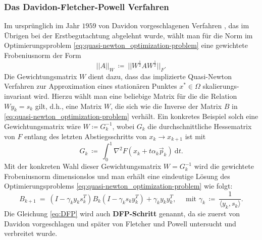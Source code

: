 \subsubsection{Das Davidon-Fletcher-Powell Verfahren}
Im ursprünglich im Jahr $1959$ von Davidon vorgeschlagenen Verfahren \cite{davidon_1959}, das im Übrigen bei der Erstbegutachtung abgelehnt wurde, wählt man für die Norm im Optimierungsproblem \eqref{eq:quasi-newton_optimization-problem} eine gewichtete Frobeniusnorm der Form
\begin{equation*}
||A||_W \ \coloneqq \ || W^\frac{1}{2}A W^\frac{1}{2} ||_F.
\end{equation*}
Die Gewichtungsmatrix $W$ dient dazu, dass das implizierte Quasi-Newton Verfahren zur Approximation eines stationären Punktes $x^* \in \Omega$ skalierungs-invariant wird. 
Hierzu wählt man eine beliebige Matrix für die die Relation $W y_k = s_k$ gilt, d.h., eine Matrix $W$, die sich wie die Inverse der Matrix $B$ in \eqref{eq:quasi-newton_optimization-problem} verhält.
Ein konkretes Beispiel solch eine Gewichtungsmatrix wäre $W \coloneqq G_k^{-1}$, wobei $G_k$ die durchschnittliche Hessematrix von $F$ entlang des letzten Abstiegsschritts von $x_k \rightarrow x_{k+1}$ ist mit
\begin{equation*}
G_k \ \coloneqq \ \int_0^1 \nabla^2 F(x_k + t \alpha_k \vec{p}_k)~\mathrm{d}t.
\end{equation*}
Mit der konkreten Wahl dieser Gewichtungsmatrix $W = G_k^{-1}$ wird die gewichtete Frobeniusnorm  dimensionslos und man erhält eine eindeutige Lösung des Optimierungsproblems \eqref{eq:quasi-newton_optimization-problem} wie folgt:
\begin{equation}
\label{eq:DFP}
B_{k+1} \ = \ (I-\gamma_k y_ks_k^T) B_k (I - \gamma_k s_k y_k^T) + \gamma_k y_k y_k^T, \quad \text{ mit } \gamma_k \ \coloneqq \ \frac{1}{\langle y_k, s_k \rangle}.
\end{equation}
Die Gleichung \eqref{eq:DFP} wird auch \textbf{DFP-Schritt} genannt, da sie zuerst von Davidon vorgeschlagen und später von Fletcher und Powell untersucht und verbreitet wurde.

